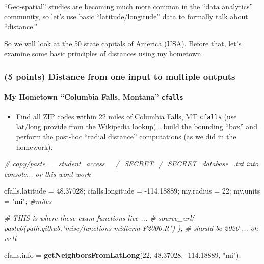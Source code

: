 \documentclass[
]{article}
\newenvironment{Shaded}{\begin{snugshade}}{\end{snugshade}}
\newcommand{\CommentTok}[1]{\textcolor[rgb]{0.56,0.35,0.01}{\textit{#1}}}
\newcommand{\DecValTok}[1]{\textcolor[rgb]{0.00,0.00,0.81}{#1}}
\newcommand{\FloatTok}[1]{\textcolor[rgb]{0.00,0.00,0.81}{#1}}
\newcommand{\KeywordTok}[1]{\textcolor[rgb]{0.13,0.29,0.53}{\textbf{#1}}}
\newcommand{\NormalTok}[1]{#1}
\newcommand{\StringTok}[1]{\textcolor[rgb]{0.31,0.60,0.02}{#1}}
\providecommand{\tightlist}{%
  \setlength{\itemsep}{0pt}\setlength{\parskip}{0pt}}
\begin{document}
``Geo-spatial'' studies are becoming much more common in the ``data
analytics'' community, so let's use basic ``latitude/longitude'' data to
formally talk about ``distance.''

So we will look at the 50 state capitals of America (USA). Before that,
let's examine some basic principles of distances using my hometown.

\hypertarget{points-distance-from-one-input-to-multiple-outputs}{%
\subsubsection{(5 points) Distance from one input to multiple
outputs}\label{points-distance-from-one-input-to-multiple-outputs}}

\hypertarget{my-hometown-columbia-falls-montana-cfalls}{%
\paragraph{\texorpdfstring{My Hometown ``Columbia Falls, Montana''
\texttt{cfalls}}{My Hometown ``Columbia Falls, Montana'' cfalls}}\label{my-hometown-columbia-falls-montana-cfalls}}

\begin{itemize}
\tightlist
\item
  Find all ZIP codes within 22 miles of Columbia Falls, MT
  \texttt{cfalls} (use lat/long provide from the Wikipedia
  lookup)\ldots{} build the bounding ``box'' and perform the post-hoc
  ``radial distance'' computations (as we did in the homework).
\end{itemize}

\begin{Shaded}
\begin{Highlighting}[]
\CommentTok{\# copy/paste \_\_student\_access\_\_/\_SECRET\_/\_SECRET\_database\_.txt into console...  or this won\textquotesingle{}t work}

\NormalTok{cfalls.latitude =}\StringTok{ }\FloatTok{48.37028}\NormalTok{; }
\NormalTok{cfalls.longitude =}\StringTok{ }\FloatTok{{-}114.18889}\NormalTok{;}
\NormalTok{my.radius =}\StringTok{ }\DecValTok{22}\NormalTok{; my.units =}\StringTok{ "mi"}\NormalTok{; }\CommentTok{\#miles}

\CommentTok{\# THIS is where these exam functions live ...}
\CommentTok{\# source\_url( paste0(path.github,"misc/functions{-}midterm{-}F2000.R") );  \# should be 2020 ... oh well}




\NormalTok{cfalls.info =}\StringTok{ }\KeywordTok{getNeighborsFromLatLong}\NormalTok{(}\DecValTok{22}\NormalTok{, }\FloatTok{48.37028}\NormalTok{, }\FloatTok{{-}114.18889}\NormalTok{, }\StringTok{"mi"}\NormalTok{);}
\end{Highlighting}
\end{Shaded}
\end{document}
